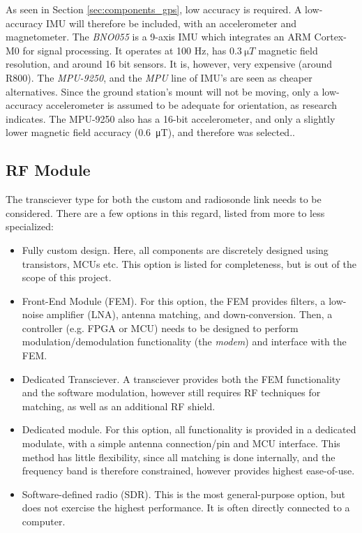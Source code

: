 As seen in Section \ref{sec:components_gps}, low accuracy is required. A low-accuracy IMU will therefore be included, with an accelerometer and magnetometer. The \textit{BNO055} is a 9-axis IMU which integrates an ARM Cortex-M0 for signal processing. It operates at 100 Hz, has $\SI{0.3}{\micro T}$ magnetic field resolution, and around 16 bit sensors. It is, however, very expensive (around R800). The \textit{MPU-9250}, and the \textit{MPU} line of IMU's are seen as cheaper alternatives. Since the ground station's mount will not be moving, only a low-accuracy accelerometer is assumed to be adequate for orientation, as research indicates. The MPU-9250 also has a 16-bit accelerometer, and only a slightly lower magnetic field accuracy (\SI{0.6}{\micro T}), and therefore was selected..

\subsection{RF Module}
The transciever type for both the custom and radiosonde link needs to be considered. There are a few options in this regard, listed from more to less specialized:
\begin{itemize}
    \item Fully custom design. Here, all components are discretely designed using transistors, MCUs etc. This option is listed for completeness, but is out of the scope of this project.
    \item Front-End Module (FEM). For this option, the FEM provides filters, a low-noise amplifier (LNA), antenna matching, and down-conversion. Then, a controller (e.g. FPGA or MCU) needs to be designed to perform modulation/demodulation functionality (the \textit{modem}) and interface with the FEM.
    \item Dedicated Transciever. A transciever provides both the FEM functionality and the software modulation, however still requires RF techniques for matching, as well as an additional RF shield.
    \item Dedicated module. For this option, all functionality is provided in a dedicated modulate, with a simple antenna connection/pin and MCU interface. This method has little flexibility, since all matching is done internally, and the frequency band is therefore constrained, however provides highest ease-of-use.
    \item Software-defined radio (SDR). This is the most general-purpose option, but does not exercise the highest performance. It is often directly connected to a computer.
\end{itemize}

